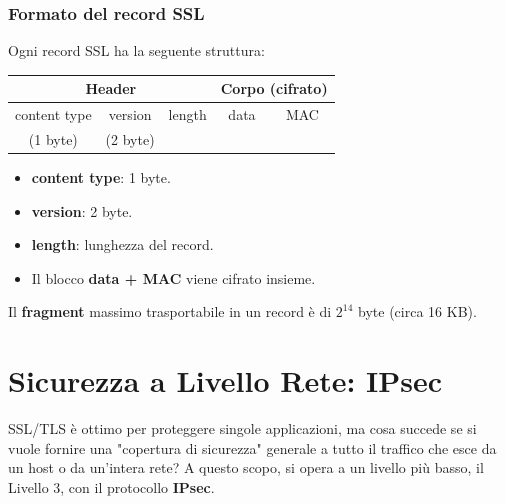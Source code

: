 \subsubsection{Formato del record SSL}
Ogni record SSL ha la seguente struttura:
\begin{center}
    \begin{tabular}{|c|c|c|c|c|}
        \hline
        \multicolumn{3}{|c|}{\textbf{Header}} & \multicolumn{2}{c|}{\textbf{Corpo (cifrato)}} \\
        \hline
        content type & version & length & data & MAC \\
        (1 byte) & (2 byte) & & & \\
        \hline
    \end{tabular}
\end{center}
\begin{itemize}
    \item \textbf{content type}: 1 byte.
    \item \textbf{version}: 2 byte.
    \item \textbf{length}: lunghezza del record.
    \item Il blocco \textbf{data + MAC} viene cifrato insieme.
\end{itemize}
Il \textbf{fragment} massimo trasportabile in un record è di $2^{14}$ byte (circa 16 KB).

\section{Sicurezza a Livello Rete: IPsec}
SSL/TLS è ottimo per proteggere singole applicazioni, ma cosa succede se si vuole fornire una "copertura di sicurezza" generale a tutto il traffico che esce da un host o da un'intera rete? A questo scopo, si opera a un livello più basso, il Livello 3, con il protocollo \textbf{IPsec}.



